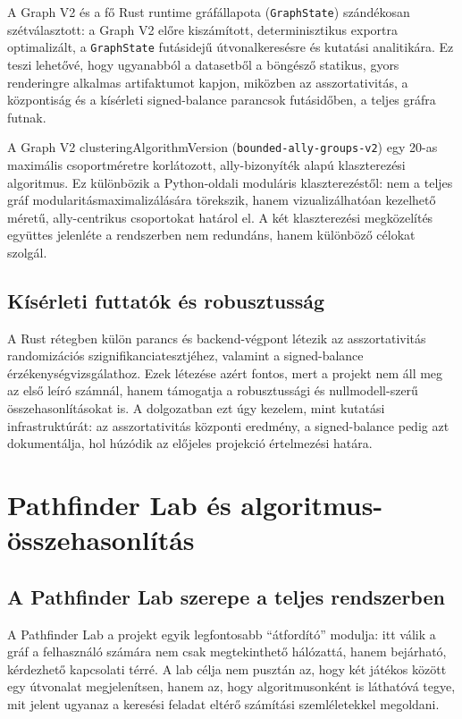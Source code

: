 ﻿\documentclass[a4paper,12pt]{report}
\begin{document}
A Graph V2 és a fő Rust runtime gráfállapota (\texttt{GraphState}) szándékosan szétválasztott: a Graph V2 előre kiszámított, determinisztikus exportra optimalizált, a \texttt{GraphState} futásidejű útvonalkeresésre és kutatási analitikára. Ez teszi lehetővé, hogy ugyanabból a datasetből a böngésző statikus, gyors renderingre alkalmas artifaktumot kapjon, miközben az asszortativitás, a központiság és a kísérleti signed-balance parancsok futásidőben, a teljes gráfra futnak.

A Graph V2 clusteringAlgorithmVersion (\texttt{bounded-ally-groups-v2}) egy 20-as maximális csoportméretre korlátozott, ally-bizonyíték alapú klaszterezési algoritmus. Ez különbözik a Python-oldali moduláris klaszterezéstől: nem a teljes gráf modularitásmaximalizálására törekszik, hanem vizualizálhatóan kezelhető méretű, ally-centrikus csoportokat határol el. A két klaszterezési megközelítés együttes jelenléte a rendszerben nem redundáns, hanem különböző célokat szolgál.

\section{Kísérleti futtatók és robusztusság}

A Rust rétegben külön parancs és backend-végpont létezik az asszortativitás randomizációs szignifikanciatesztjéhez, valamint a signed-balance érzékenységvizsgálathoz. Ezek létezése azért fontos, mert a projekt nem áll meg az első leíró számnál, hanem támogatja a robusztussági és nullmodell-szerű összehasonlításokat is. A dolgozatban ezt úgy kezelem, mint kutatási infrastruktúrát: az asszortativitás központi eredmény, a signed-balance pedig azt dokumentálja, hol húzódik az előjeles projekció értelmezési határa.

\chapter{Pathfinder Lab és algoritmus-összehasonlítás}

\section{A Pathfinder Lab szerepe a teljes rendszerben}

A Pathfinder Lab a projekt egyik legfontosabb ``átfordító'' modulja: itt válik a gráf a felhasználó számára nem csak megtekinthető hálózattá, hanem bejárható, kérdezhető kapcsolati térré. A lab célja nem pusztán az, hogy két játékos között egy útvonalat megjelenítsen, hanem az, hogy algoritmusonként is láthatóvá tegye, mit jelent ugyanaz a keresési feladat eltérő számítási szemléletekkel megoldani.
\end{document}
